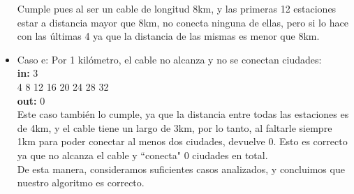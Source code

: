 \begin{itemize}
Cumple pues al ser un cable de longitud 8km, y las primeras 12 estaciones estar a distancia mayor que 8km, no conecta ninguna de ellas, pero si lo hace con las últimas 4 ya que la distancia de las mismas es menor que 8km. \\

\item Caso e: Por 1 kilómetro, el cable no alcanza y no se conectan ciudades:\\
\textbf{in:}
3\\
4 8 12 16 20 24 28 32 \\
\textbf{out:}
0\\

Este caso también lo cumple, ya que la distancia entre todas las estaciones es de 4km, y el cable tiene un largo de 3km, por lo tanto, al faltarle siempre 1km para poder conectar al menos dos ciudades, devuelve 0. Esto es correcto ya que no alcanza el cable y ``conecta" 0 ciudades en total. \\

De esta manera, consideramos suficientes casos analizados, y concluimos que nuestro algoritmo es correcto.

\end{itemize}


